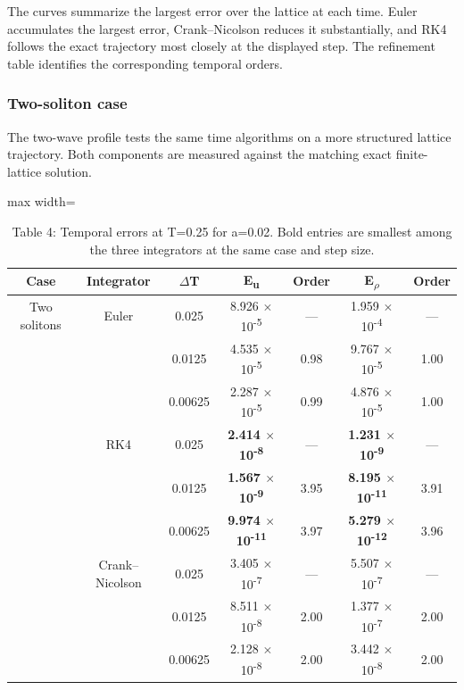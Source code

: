 \documentclass{article}
\begin{document}
The curves summarize the largest error over the lattice at each time. Euler accumulates the largest error, Crank–Nicolson reduces it substantially, and RK4 follows the exact trajectory most closely at the displayed step. The refinement table identifies the corresponding temporal orders.

\subsubsection*{Two-soliton case}

The two-wave profile tests the same time algorithms on a more structured lattice trajectory. Both components are measured against the matching exact finite-lattice solution.

\begin{table}[!htbp]
\centering
\caption*{Table 4: Temporal errors at T=0.25 for a=0.02. Bold entries are smallest among the three integrators at the same case and step size.}
\normalsize
\setlength{\tabcolsep}{6pt}
\renewcommand{\arraystretch}{1.25}\setlength{\extrarowheight}{1pt}
\setlength{\tabcolsep}{4pt}
\begin{adjustbox}{max width=\linewidth}
\begin{tabular}{ccccccc}

\hline
\multicolumn{1}{c}{Case} & \multicolumn{1}{c}{Integrator} & \multicolumn{1}{c}{\(\Delta\)T} & \multicolumn{1}{c}{E\textsubscript{u}} & \multicolumn{1}{c}{Order} & \multicolumn{1}{c}{E\textsubscript{\(\rho\)}} & \multicolumn{1}{c}{Order} \\
\hline
Two solitons & Euler & 0.025 & 8.926 \(\times\) 10\textsuperscript{-5} & — & 1.959 \(\times\) 10\textsuperscript{-4} & — \\
 &  & 0.0125 & 4.535 \(\times\) 10\textsuperscript{-5} & 0.98 & 9.767 \(\times\) 10\textsuperscript{-5} & 1.00 \\
 &  & 0.00625 & 2.287 \(\times\) 10\textsuperscript{-5} & 0.99 & 4.876 \(\times\) 10\textsuperscript{-5} & 1.00 \\
 & RK4 & 0.025 & \textbf{2.414 \(\times\) 10\textsuperscript{-8}} & — & \textbf{1.231 \(\times\) 10\textsuperscript{-9}} & — \\
 &  & 0.0125 & \textbf{1.567 \(\times\) 10\textsuperscript{-9}} & 3.95 & \textbf{8.195 \(\times\) 10\textsuperscript{-11}} & 3.91 \\
 &  & 0.00625 & \textbf{9.974 \(\times\) 10\textsuperscript{-11}} & 3.97 & \textbf{5.279 \(\times\) 10\textsuperscript{-12}} & 3.96 \\
 & Crank–Nicolson & 0.025 & 3.405 \(\times\) 10\textsuperscript{-7} & — & 5.507 \(\times\) 10\textsuperscript{-7} & — \\
 &  & 0.0125 & 8.511 \(\times\) 10\textsuperscript{-8} & 2.00 & 1.377 \(\times\) 10\textsuperscript{-7} & 2.00 \\
 &  & 0.00625 & 2.128 \(\times\) 10\textsuperscript{-8} & 2.00 & 3.442 \(\times\) 10\textsuperscript{-8} & 2.00 \\
\hline
\end{tabular}
\end{adjustbox}
\end{table}
\end{document}
